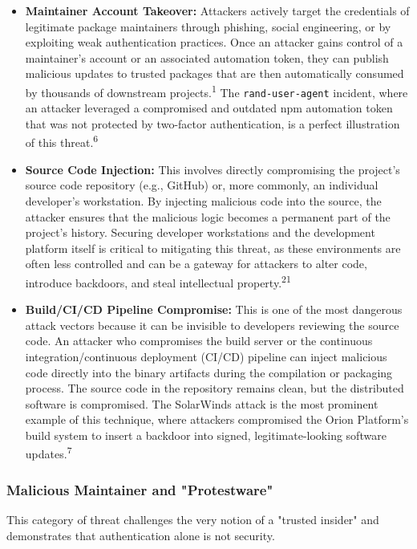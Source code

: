 \documentclass{article}
\begin{document}
\begin{itemize}
\item \textbf{Maintainer Account Takeover:} Attackers actively target the credentials of legitimate package maintainers through phishing, social engineering, or by exploiting weak authentication practices. Once an attacker gains control of a maintainer's account or an associated automation token, they can publish malicious updates to trusted packages that are then automatically consumed by thousands of downstream projects.\textsuperscript{1} The \lstinline{rand-user-agent} incident, where an attacker leveraged a compromised and outdated npm automation token that was not protected by two-factor authentication, is a perfect illustration of this threat.\textsuperscript{6}
\item \textbf{Source Code Injection:} This involves directly compromising the project's source code repository (e.g., GitHub) or, more commonly, an individual developer's workstation. By injecting malicious code into the source, the attacker ensures that the malicious logic becomes a permanent part of the project's history. Securing developer workstations and the development platform itself is critical to mitigating this threat, as these environments are often less controlled and can be a gateway for attackers to alter code, introduce backdoors, and steal intellectual property.\textsuperscript{21}
\item \textbf{Build/CI/CD Pipeline Compromise:} This is one of the most dangerous attack vectors because it can be invisible to developers reviewing the source code. An attacker who compromises the build server or the continuous integration/continuous deployment (CI/CD) pipeline can inject malicious code directly into the binary artifacts during the compilation or packaging process. The source code in the repository remains clean, but the distributed software is compromised. The SolarWinds attack is the most prominent example of this technique, where attackers compromised the Orion Platform's build system to insert a backdoor into signed, legitimate-looking software updates.\textsuperscript{7}
\end{itemize}

\subsubsection{Malicious Maintainer and "Protestware"}

This category of threat challenges the very notion of a "trusted insider" and demonstrates that authentication alone is not security.
\end{document}
